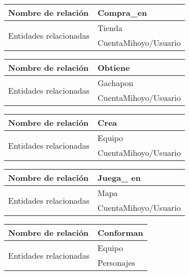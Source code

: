 \documentclass{report}
\begin{document}
\hfill

\begin{center}    
    \begin{tabular}{|p{3cm}|p{5cm}|}
    \hline
    Nombre de relación& Compra\_en\\ 
    \hline
    \hline
    \multirow{2}{6em}{Entidades relacionadas}&Tienda \\ &CuentaMihoyo/Usuario\\ 
    \hline
    \end{tabular}
\end{center}

\hfill

\begin{center}    
    \begin{tabular}{|p{3cm}|p{5cm}|}
    \hline
    Nombre de relación& Obtiene\\ 
    \hline
    \hline
    \multirow{2}{6em}{Entidades relacionadas}& Gachapon \\ &CuentaMihoyo/Usuario\\ 
    \hline
    \end{tabular}
\end{center}

\hfill

\begin{center}    
    \begin{tabular}{|p{3cm}|p{5cm}|}
    \hline
    Nombre de relación& Crea\\ 
    \hline
    \hline
    \multirow{2}{6em}{Entidades relacionadas}&Equipo \\ &CuentaMihoyo/Usuario\\ 
    \hline
    \end{tabular}
\end{center}

\hfill

\begin{center}    
    \begin{tabular}{|p{3cm}|p{5cm}|}
    \hline
    Nombre de relación& Juega\_ en\\ 
    \hline
    \hline
    \multirow{2}{6em}{Entidades relacionadas}& Mapa \\ &CuentaMihoyo/Usuario\\ 
    \hline
    \end{tabular}
\end{center}

\hfill

\begin{center}    
    \begin{tabular}{|p{3cm}|p{5cm}|}
    \hline
    Nombre de relación& Conforman\\ 
    \hline
    \hline
    \multirow{2}{6em}{Entidades relacionadas}& Equipo \\ &Personajes\\ 
    \hline
    \end{tabular}
\end{center}
\end{document}
